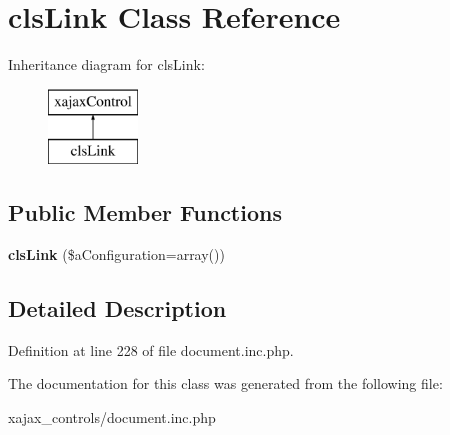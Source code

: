 \hypertarget{classclsLink}{
\section{clsLink Class Reference}
\label{classclsLink}
}
Inheritance diagram for clsLink:\begin{figure}[H]
\begin{center}
\leavevmode
\includegraphics[height=2.000000cm]{classclsLink}
\end{center}
\end{figure}
\subsection*{Public Member Functions}
\begin{DoxyCompactItemize}
\item 
\hypertarget{classclsLink_a120fd3d895c7687e92a4f30d46cc1a23}{
{\bfseries clsLink} (\$aConfiguration=array())}
\label{classclsLink_a120fd3d895c7687e92a4f30d46cc1a23}

\end{DoxyCompactItemize}


\subsection{Detailed Description}


Definition at line 228 of file document.inc.php.



The documentation for this class was generated from the following file:\begin{DoxyCompactItemize}
\item 
xajax\_\-controls/document.inc.php\end{DoxyCompactItemize}
